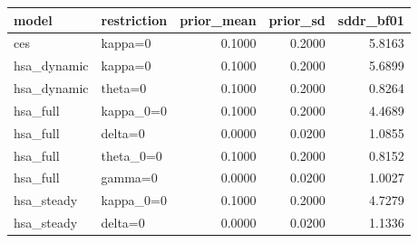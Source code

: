 \begin{tabular}{llrrr}
\toprule
model & restriction & prior\_mean & prior\_sd & sddr\_bf01 \\
\midrule
ces & kappa=0 & 0.1000 & 0.2000 & 5.8163 \\
hsa\_dynamic & kappa=0 & 0.1000 & 0.2000 & 5.6899 \\
hsa\_dynamic & theta=0 & 0.1000 & 0.2000 & 0.8264 \\
hsa\_full & kappa\_0=0 & 0.1000 & 0.2000 & 4.4689 \\
hsa\_full & delta=0 & 0.0000 & 0.0200 & 1.0855 \\
hsa\_full & theta\_0=0 & 0.1000 & 0.2000 & 0.8152 \\
hsa\_full & gamma=0 & 0.0000 & 0.0200 & 1.0027 \\
hsa\_steady & kappa\_0=0 & 0.1000 & 0.2000 & 4.7279 \\
hsa\_steady & delta=0 & 0.0000 & 0.0200 & 1.1336 \\
\bottomrule
\end{tabular}
